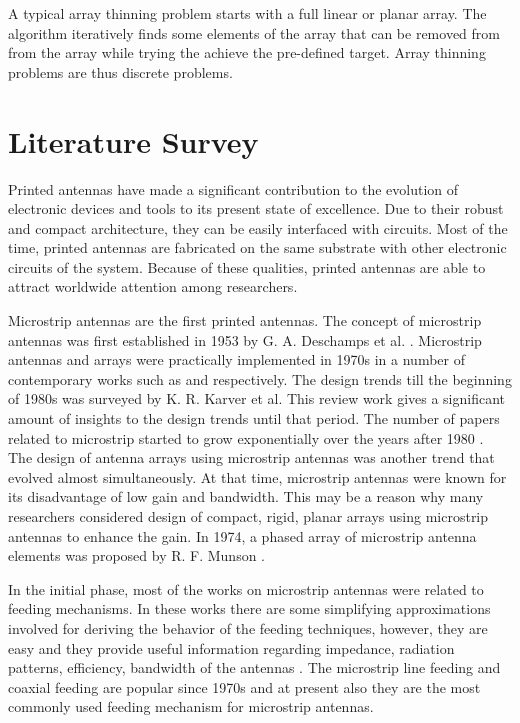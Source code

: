 A typical array thinning problem starts with a full linear or planar array. The algorithm iteratively finds some elements of the array that can be removed from from the array while trying the achieve the pre-defined target. Array thinning problems are thus discrete problems.

\section{Literature Survey}
Printed antennas have made a significant contribution to the evolution of electronic devices and tools to its present state of excellence. Due to their robust and compact architecture, they can be easily interfaced with circuits. Most of the time, printed antennas are fabricated on the same substrate with other electronic circuits of the system. Because of these qualities, printed antennas are able to attract worldwide attention among researchers.

Microstrip antennas are the first printed antennas. The concept of microstrip antennas was first established in 1953 by G. A. Deschamps et al. \cite{mpa00}. Microstrip antennas and arrays were practically implemented in 1970s in a number of contemporary works such as \cite{mpa02} and \cite{mpa01} respectively. The design trends till the beginning of 1980s was surveyed by K. R. Karver et al\cite{mpaSurvTech}. This review work gives a significant amount of insights to the design trends until that period. The number of papers related to microstrip started to grow exponentially over the years after 1980 \cite{mpaHist01}. The design of antenna arrays using microstrip antennas was another trend that evolved almost simultaneously. At that time, microstrip antennas were known for its disadvantage of low gain and bandwidth. This may be a reason why many researchers considered design of compact, rigid, planar arrays using microstrip antennas to enhance the gain. In 1974, a phased array of microstrip antenna elements was proposed by R. F. Munson \cite{txmPhasedArray}.

In the initial phase, most of the works on microstrip antennas were related to feeding mechanisms. In these works there are some simplifying approximations involved for deriving the behavior of the feeding techniques, however, they are easy and they provide useful information regarding impedance, radiation patterns, efficiency, bandwidth of the antennas \cite{mpaReview1992}. The microstrip line feeding and coaxial feeding are popular since 1970s and at present also they are the most commonly used feeding mechanism for microstrip antennas.

